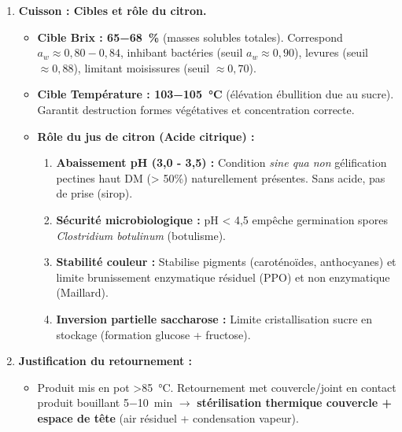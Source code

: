 \documentclass[11pt]{article}
\begin{document}
\begin{exoresolu}
\begin{enumerate}
\begin{enumerate}
                \item \textbf{Pasteurisation / Retournement :} Retourner pots (\SI{5-10}{min}) $\rightarrow$ stérilisation couvercle/joint par chaleur produit. Remettre à l'endroit, refroidissement rapide $\rightarrow$ création vide (dépression \emph{« pop »}).
                \item \textbf{Étiquetage et Stockage :} Etiquette (nom, ingrédients, date, lot, DLUO). Stockage local frais (\SI{<20}{\celsius}), sec, obscurité.
            \end{enumerate}
        \item \textbf{Cuisson : Cibles et rôle du citron.}
            \begin{itemize}
                \item \textbf{Cible Brix : \SI{65-68}{\%}} (masses solubles totales). Correspond $a_w \approx 0,80-0,84$, inhibant bactéries (seuil $a_w \approx 0,90$), levures (seuil $\approx 0,88$), limitant moisissures (seuil $\approx 0,70$).
                \item \textbf{Cible Température : \SI{103-105}{\celsius}} (élévation ébullition due au sucre). Garantit destruction formes végétatives et concentration correcte.
                \item \textbf{Rôle du jus de citron (Acide citrique) :}
                    \begin{enumerate}
                        \item \textbf{Abaissement pH (3,0 - 3,5) :} Condition \emph{sine qua non} gélification pectines haut DM (> 50\%) naturellement présentes. Sans acide, pas de prise (sirop).
                        \item \textbf{Sécurité microbiologique :} pH < 4,5 empêche germination spores \textit{Clostridium botulinum} (botulisme).
                        \item \textbf{Stabilité couleur :} Stabilise pigments (caroténoïdes, anthocyanes) et limite brunissement enzymatique résiduel (PPO) et non enzymatique (Maillard).
                        \item \textbf{Inversion partielle saccharose :} Limite cristallisation sucre en stockage (formation glucose + fructose).
                    \end{enumerate}
            \end{itemize}
        \item \textbf{Justification du retournement :}
            \begin{itemize}
                \item Produit mis en pot \SI{>85}{\celsius}. Retournement met couvercle/joint en contact produit bouillant \SI{5-10}{min} $\rightarrow$ \textbf{stérilisation thermique couvercle + espace de tête} (air résiduel + condensation vapeur).

\end{itemize}
\end{enumerate}
\end{exoresolu}
\end{document}
